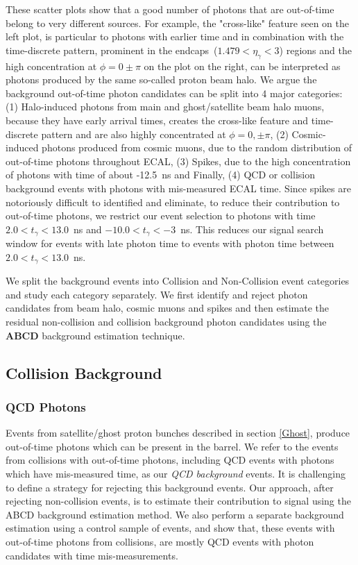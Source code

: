 \vspace{5mm}
These scatter plots show that a good number of photons that are out-of-time belong to very different sources. For example, the "cross-like" feature seen on the left plot, is particular to photons with earlier time and in combination with the time-discrete pattern, prominent in the endcaps~($1.479 < \eta_{\gamma} < 3$) regions and the high concentration at $\phi=0\pm\pi$ on the plot on the right, can be interpreted as photons produced by the same so-called proton beam halo. We argue the background out-of-time photon candidates can be split into 4 major categories: (1) Halo-induced photons from main and ghost/satellite beam halo muons, because they have early arrival times, creates the cross-like feature and time-discrete pattern and are also highly concentrated at $\phi=0,\pm\pi$, (2) Cosmic-induced photons produced from cosmic muons, due to the random distribution of out-of-time photons throughout ECAL, (3) Spikes, due to the high concentration of photons with time of about -12.5~ns and Finally, (4) QCD or collision background events with photons with mis-measured ECAL time.
\newline
Since spikes are notoriously difficult to identified and eliminate, to reduce their contribution to out-of-time photons,  we restrict our event selection to photons with time $ 2.0 < t_{\gamma} < 13.0$~ns and $-10.0 < t_{\gamma} < -3$~ns. This reduces our signal search window for events with late photon time to events with photon time between $2.0 < t_{\gamma} < 13.0$~ns.
\par 
We split the background events into Collision and Non-Collision event categories and study each category separately. We first identify and reject photon candidates from beam halo, cosmic muons and spikes and then estimate the residual non-collision and collision background photon candidates  using the \textbf{\textsf{ABCD}} background estimation technique. 

\subsection{Collision Background}
\subsubsection{QCD Photons}
Events from satellite/ghost proton bunches described in section \ref{Ghost}, produce out-of-time photons which can be present in the barrel. We refer to the events from collisions with out-of-time photons, including QCD events with photons which have mis-measured time, as our \textit{QCD background} events. It is challenging to define a strategy for rejecting this background events. Our approach, after rejecting non-collision events, is to estimate their contribution to signal using the \textsf{ABCD} background estimation method. We also perform a separate background estimation using a control sample of \PZ events, and show that, these events with out-of-time photons from collisions, are mostly QCD events with photon candidates with time mis-measurements.

